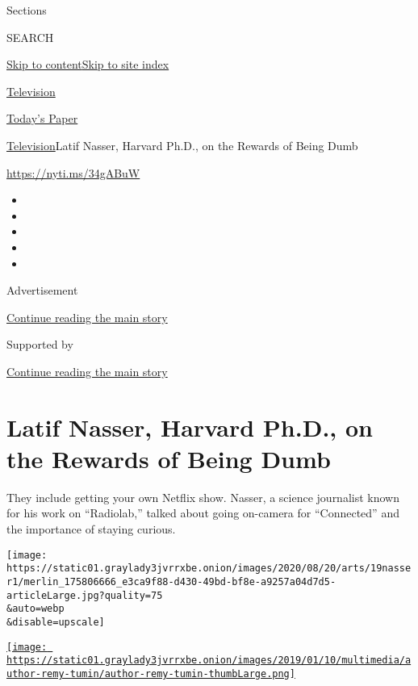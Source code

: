 Sections

SEARCH

\protect\hyperlink{site-content}{Skip to
content}\protect\hyperlink{site-index}{Skip to site index}

\href{https://www.nytimes3xbfgragh.onion/section/arts/television}{Television}

\href{https://myaccount.nytimes3xbfgragh.onion/auth/login?response_type=cookie\&client_id=vi}{}

\href{https://www.nytimes3xbfgragh.onion/section/todayspaper}{Today's
Paper}

\href{/section/arts/television}{Television}\textbar{}Latif Nasser,
Harvard Ph.D., on the Rewards of Being Dumb

\url{https://nyti.ms/34gABuW}

\begin{itemize}
\item
\item
\item
\item
\item
\end{itemize}

Advertisement

\protect\hyperlink{after-top}{Continue reading the main story}

Supported by

\protect\hyperlink{after-sponsor}{Continue reading the main story}

\hypertarget{latif-nasser-harvard-phd-on-the-rewards-of-being-dumb}{%
\section{Latif Nasser, Harvard Ph.D., on the Rewards of Being
Dumb}\label{latif-nasser-harvard-phd-on-the-rewards-of-being-dumb}}

They include getting your own Netflix show. Nasser, a science journalist
known for his work on ``Radiolab,'' talked about going on-camera for
``Connected'' and the importance of staying curious.

\texttt{[image: https://static01.graylady3jvrrxbe.onion/images/2020/08/20/arts/19nasser1/merlin\_175806666\_e3ca9f88-d430-49bd-bf8e-a9257a04d7d5-articleLarge.jpg?quality=75\\\&auto=webp\\\&disable=upscale]}

\href{https://www.nytimes3xbfgragh.onion/by/remy-tumin}{\texttt{[image: https://static01.graylady3jvrrxbe.onion/images/2019/01/10/multimedia/author-remy-tumin/author-remy-tumin-thumbLarge.png]}}

